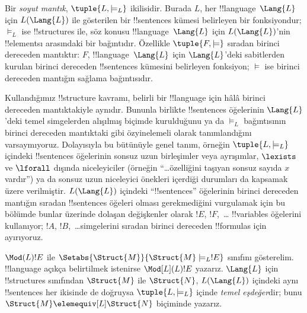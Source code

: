 


\begin{defn}
Bir \emph{soyut mantık}, $\tuple{L, \models_L}$ ikilisidir. Burada $L$,
her !!{language}~$\Lang{L}$ için $L(\Lang{L})$ ile gösterilen bir
!!{sentence}s kümesi belirleyen bir fonksiyondur; $\models_L$ ise
!!{structure}s ile, söz konusu !!{language}~$\Lang{L}$ için
$L(\Lang{L})$'nin !!{element}s{}ı arasındaki bir bağıntıdır. Özellikle $\tuple{F, \models}$
sıradan birinci dereceden mantıktır: $F$, !!{language}~$\Lang{L}$ için
$\Lang{L}$'deki sabitlerden kurulan birinci dereceden !!{sentence}s
kümesini belirleyen fonksiyon; $\models$ ise birinci dereceden mantığın
sağlama bağıntısıdır.
\end{defn}

Kullandığımız !!{structure} kavramı, belirli bir !!{language} için hâlâ
birinci dereceden mantıktakiyle aynıdır. Bununla birlikte !!{sentence}s
öğelerinin $\Lang{L}$'deki temel simgelerden alışılmış biçimde kurulduğunu
ya da $\models_L$ bağıntısının birinci dereceden mantıktaki gibi özyinelemeli
olarak tanımlandığını varsaymıyoruz. Dolayısıyla bu bütünüyle genel tanım,
örneğin $\tuple{L,\models_L}$ içindeki !!{sentence}s öğelerinin sonsuz uzun
birleşimler veya ayrışımlar, $\lexists$ ve $\lforall$ dışında niceleyiciler
(örneğin ``\dots özelliğini taşıyan sonsuz sayıda $x$ vardır'') ya da sonsuz
uzun niceleyici önekleri içerdiği durumları da kapsamak üzere verilmiştir.
$L(\Lang{L})$ içindeki ``!!{sentence}s'' öğelerinin birinci dereceden
mantığın sıradan !!{sentence}s öğeleri olması gerekmediğini vurgulamak için
bu bölümde bunlar üzerinde dolaşan değişkenler olarak $!E$, $!F$,~\dots
!!{variable}s öğelerini kullanıyor; $!A$, $!B$,~\dots simgelerini sıradan
birinci dereceden !!{formula}s için ayırıyoruz.

\begin{defn}
$\Mod(L){!E}$ ile $\Setabs{\Struct{M}}{\Struct{M} \models_L !E}$ sınıfını
gösterelim. !!{language} açıkça belirtilmek istenirse $\Mod[L](L){!E}$
yazarız. $\Lang{L}$ için !!{structure}s sınıfından $\Struct{M}$ ile
$\Struct{N}$,
$L(\Lang{L})$ içindeki aynı !!{sentence}s her ikisinde de doğruysa
$\tuple{L, \models_L}$ içinde \emph{temel eşdeğer}dir; bunu
$\Struct{M} \elemequiv[L] \Struct{N}$ biçiminde yazarız.
\end{defn}

